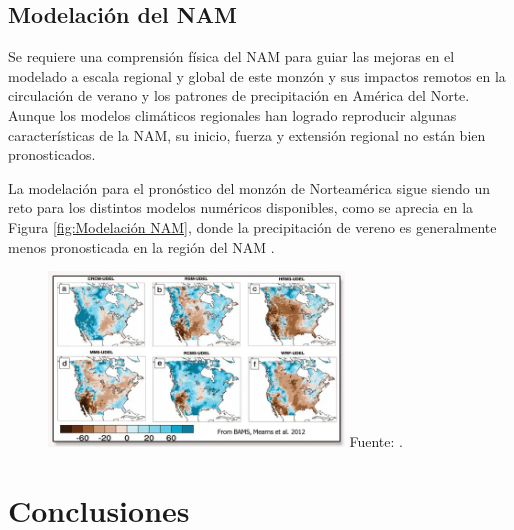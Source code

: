 \documentclass[12pt]{article}
\begin{document}
\subsection{Modelación del NAM}

Se requiere una comprensión física del NAM para guiar las mejoras en el modelado a escala regional y global de este monzón y sus impactos remotos en la circulación de verano y los patrones de precipitación en América del Norte. Aunque los modelos climáticos regionales han logrado reproducir algunas características de la NAM, su inicio, fuerza y extensión regional no están bien pronosticados. 

La modelación para el pronóstico del monzón de Norteamérica sigue siendo un reto para los distintos modelos numéricos disponibles, como se aprecia en la Figura \ref{fig:Modelación NAM}, donde la precipitación de vereno es generalmente menos pronosticada en la región del NAM \cite{DRI}.

\begin{figure}[H]
	\begin{center}
 		\includegraphics[width = 0.7\textwidth]{Imagenes/NAM1.png}
 		 Fuente: \cite{DRI}.
	\end{center} 
\end{figure}

\section{Conclusiones}
\end{document}
